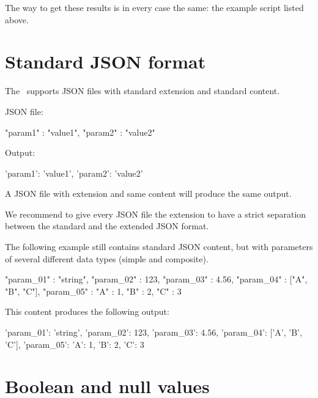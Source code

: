 The way to get these results is in every case the same: the example script listed above.


\section{Standard JSON format}

The \pkg\ supports JSON files with standard extension  and standard content.

JSON file:

\begin{pythoncode}
{
   "param1" : "value1",
   "param2" : "value2"
}
\end{pythoncode}

Output:

\begin{pythonlog}
{'param1': 'value1', 'param2': 'value2'}
\end{pythonlog}

A JSON file with extension  and same content will produce the same output.

We recommend to give every JSON file the extension  to have a strict separation between the standard and the extended JSON format.

The following example still contains standard JSON content, but with parameters of several different data types (simple and composite).

\begin{pythoncode}
{
   "param_01" : "string",
   "param_02" : 123,
   "param_03" : 4.56,
   "param_04" : ["A", "B", "C"],
   "param_05" : {"A" : 1, "B" : 2, "C" : 3}
}
\end{pythoncode}

This content produces the following output:

\begin{pythonlog}
{'param_01': 'string',
 'param_02': 123,
 'param_03': 4.56,
 'param_04': ['A', 'B', 'C'],
 'param_05': {'A': 1, 'B': 2, 'C': 3}}
\end{pythonlog}


\section{Boolean and null values}

